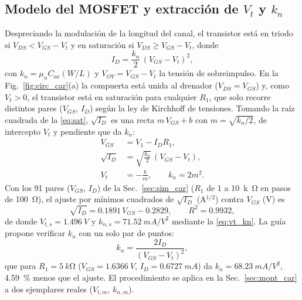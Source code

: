 \documentclass[conference]{IEEEtran}
\newcommand{\kn}{k_n}
\newcommand{\Vov}{V_{OV}}
\newcommand{\Vts}{V_{t,s}}
\newcommand{\kns}{k_{n,s}}
\newcommand{\Vtm}{V_{t,m}}
\newcommand{\knm}{k_{n,m}}
\begin{document}
\subsection{Modelo del MOSFET y extracción de $V_t$ y $\kn$}
Despreciando la modulación de la longitud del canal, el transistor está en triodo si $V_{DS}<V_{GS}-V_t$ y en saturación si $V_{DS}\ge V_{GS}-V_t$, donde \cite{sedra}
\begin{equation}
I_D=\frac{\kn}{2}\,(V_{GS}-V_t)^2,
\label{eq:sat}
\end{equation}
con $\kn=\mu_n C_{ox}(W/L)$ y $\Vov=V_{GS}-V_t$ la tensión de sobreimpulso. En la Fig.~\ref{fig:circ_car}(a) la compuerta está unida al drenador ($V_{DS}=V_{GS}$) y, como $V_t>0$, el transistor está en saturación para cualquier $R_1$, que solo recorre distintos pares ($V_{GS}$, $I_D$) según la ley de Kirchhoff de tensiones. Tomando la raíz cuadrada de la \eqref{eq:sat}, $\sqrt{I_D}$ es una recta $m\,V_{GS}+b$ con $m=\sqrt{\kn/2}$, de intercepto $V_t$ y pendiente que da $\kn$:
\begin{align}
V_{GS}&=V_1-I_D R_1,\label{eq:kvl_car}\\
\sqrt{I_D}&=\sqrt{\tfrac{\kn}{2}}\,(V_{GS}-V_t),\label{eq:raiz}\\
V_t&=-\frac{b}{m},\qquad \kn=2m^2.\label{eq:vt_kn}
\end{align}
Con los 91 pares ($V_{GS}$, $I_D$) de la Sec.~\ref{sec:sim_car} ($R_1$ de 1 a \SI{10}{k\ohm} en pasos de \SI{100}{\ohm}), el ajuste por mínimos cuadrados de $\sqrt{I_D}$ (A$^{1/2}$) contra $V_{GS}$ (V) es
\begin{equation}
\sqrt{I_D}=0.1891\,V_{GS}-0.2829,\qquad R^2=0.9932,
\label{eq:recta}
\end{equation}
de donde $\Vts=\SI{1.496}{V}$ y $\kns=\SI{71.52}{mA/V^2}$ mediante la \eqref{eq:vt_kn}. La guía propone verificar $\kn$ con un solo par de puntos:
\begin{equation}
\kn=\frac{2I_D}{(V_{GS}-V_t)^2},
\label{eq:kn_punto}
\end{equation}
que para $R_1=\SI{5}{k\ohm}$ ($V_{GS}=\SI{1.6366}{V}$, $I_D=\SI{0.6727}{mA}$) da $\kn=\SI{68.23}{mA/V^2}$, \SI{4.59}{\percent} menos que el ajuste. El procedimiento se aplica en la Sec.~\ref{sec:mont_car} a dos ejemplares reales ($\Vtm$, $\knm$).
\end{document}

